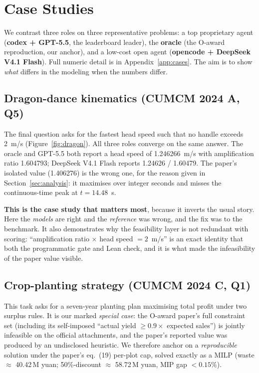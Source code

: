 \section{Case Studies}
\label{sec:cases}

We contrast three roles on three representative problems: a top proprietary agent (\textbf{codex + GPT-5.5}, the leaderboard leader), the \textbf{oracle} (the O-award reproduction, our anchor), and a low-cost open agent (\textbf{opencode + DeepSeek V4.1 Flash}). Full numeric detail is in Appendix~\ref{app:cases}. The aim is to show \emph{what} differs in the modeling when the numbers differ.

\subsection{Dragon-dance kinematics (CUMCM 2024 A, Q5)}
The final question asks for the fastest head speed such that no handle exceeds 2~m/s (Figure~\ref{fig:dragon}). All three roles converge on the same answer. The oracle and GPT-5.5 both report a head speed of 1.246266~m/s with amplification ratio 1.604793; DeepSeek V4.1 Flash reports 1.24626 / 1.60479. The paper's isolated value (1.406276) is the wrong one, for the reason given in Section~\ref{sec:analysis}: it maximises over integer seconds and misses the continuous-time peak at $t=14.48$~s.

\textbf{This is the case study that matters most}, because it inverts the usual story. Here the \emph{models} are right and the \emph{reference} was wrong, and the fix was to the benchmark. It also demonstrates why the feasibility layer is not redundant with scoring: ``amplification ratio $\times$ head speed $=2$~m/s'' is an exact identity that both the programmatic gate and Lean check, and it is what made the infeasibility of the paper value visible.

\subsection{Crop-planting strategy (CUMCM 2024 C, Q1)}
This task asks for a seven-year planting plan maximising total profit under two surplus rules. It is our marked \emph{special case}: the O-award paper's full constraint set (including its self-imposed ``actual yield $\ge 0.9\times$ expected sales'') is jointly infeasible on the official attachments, and the paper's reported value was produced by an undisclosed heuristic. We therefore anchor on a \emph{reproducible} solution under the paper's eq.~(19) per-plot cap, solved exactly as a MILP (waste $\approx$ 40.42\,M yuan; 50\%-discount $\approx$ 58.72\,M yuan, MIP gap $<0.15\%$).

